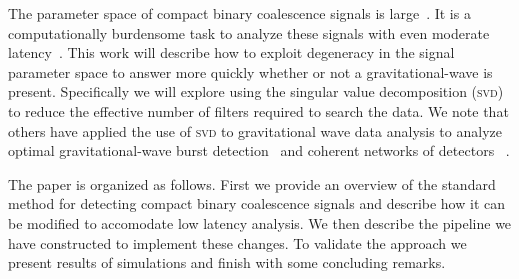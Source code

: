 The parameter space of compact binary coalescence signals is large~\cite{Owen:1995tm, Owen:1998dk}.  It is a
computationally burdensome task to analyze these signals with even moderate
latency~\cite{Abbott:2007xi}.  
This work will describe how to exploit degeneracy in the signal
parameter space to answer more quickly whether or not a gravitational-wave 
is present. Specifically we will explore using the singular value decomposition (\textsc{svd}) to reduce the
effective number of filters required to search the data.  We note that others
have applied the use of \textsc{svd} to gravitational wave data analysis to analyze
optimal gravitational-wave burst detection~\cite{bradyraymajumder2004, heng2008} and coherent networks 
of detectors~\cite{wen2008} .

The paper is organized as follows.  First we provide an overview of the 
standard method for detecting compact binary coalescence signals and
describe how it can be modified to accomodate low latency analysis.  We
then describe the pipeline we have constructed to implement these changes.
To validate the approach we present results of simulations and finish
with some concluding remarks. 

